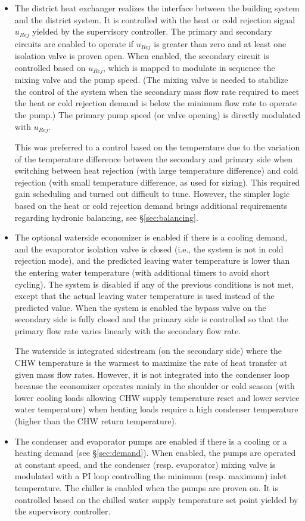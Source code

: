 \begin{itemize}
    \item The district heat exchanger realizes the interface between the building system and the district system.
    It is controlled with the heat or cold rejection signal $u_{Rej}$ yielded by the supervisory controller.
    The primary and secondary circuits are enabled to operate if $u_{Rej}$ is greater than zero and at least one isolation valve is proven open.
    When enabled, the secondary circuit is controlled based on $u_{Rej}$, which is mapped to modulate in sequence the mixing valve and the pump speed. (The mixing valve is needed to stabilize the control of the system when the secondary mass flow rate required to meet the heat or cold rejection demand is below the minimum flow rate to operate the pump.)
    The primary pump speed (or valve opening) is directly modulated with $u_{Rej}$.

    This was preferred to a control based on the temperature due to the variation of the temperature difference between the secondary and primary side when switching between heat rejection (with large temperature difference) and cold rejection (with small temperature difference, as used for sizing). This required gain scheduling and turned out difficult to tune. However, the simpler logic based on the heat or cold rejection demand brings additional requirements regarding hydronic balancing, see §\ref{sec:balancing}.

    \item The optional waterside economizer is enabled if there is a cooling demand, and the evaporator isolation valve is closed (i.e., the system is not in cold rejection mode), and the predicted leaving water temperature is lower than the entering water temperature (with additional timers to avoid short cycling). The system is disabled if any of the previous conditions is not met, except that the actual leaving water temperature is used instead of the predicted value.
    When the system is enabled the bypass valve on the secondary side is fully closed and the primary side is controlled so that the primary flow rate varies linearly with the secondary flow rate.

    The waterside is integrated sidestream (on the secondary side) where the CHW temperature is the warmest to maximize the rate of heat transfer at given mass flow rates. However, it is not integrated into the condenser loop because the economizer operates mainly in the shoulder or cold season (with lower cooling loads allowing CHW supply temperature reset and lower service water temperature) when heating loads require a high condenser temperature (higher than the CHW return temperature).

    \item The condenser and evaporator pumps are enabled if there is a cooling or a heating demand (see §\ref{sec:demand}). When enabled, the pumps are operated at constant speed, and the condenser (resp. evaporator) mixing valve is modulated with a PI loop controlling the minimum (resp. maximum) inlet temperature. The chiller is enabled when the pumps are proven on. It is controlled based on the chilled water supply temperature set point yielded by the supervisory controller.
\end{itemize}

